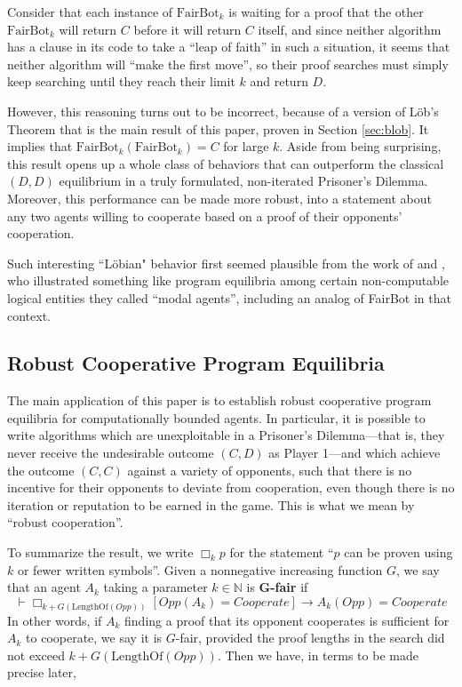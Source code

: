 \documentclass[onecolumn,authordate]{miri-tech-article}
\numberwithin{equation}{section}
\theoremstyle{definition}
\newcommand{\NN}{\mathbb{N}}
\newcommand{\proves}[1]{\underset{#1}{\vdash}}
\newcommand{\bx}[1]{\Box_{#1}}
\renewcommand{\implies}{\rightarrow}
\renewcommand{\-}{^{-1}}
\newcommand{\FB}{\mathrm{FairBot}}
\begin{document}
Consider that each instance of $\FB_k$ is waiting for a proof that the other $\FB_k$ will return $C$ before it will return $C$ itself, and since neither algorithm has a clause in its code to take a ``leap of faith'' in such a situation, it seems that neither algorithm will ``make the first move'', so their proof searches must simply keep searching until they reach their limit $k$ and return $D$.

However, this reasoning turns out to be incorrect, because of a version of L\"{o}b's Theorem that is the main result of this paper, proven in Section \ref{sec:blob}.  It implies that $\FB_k(\FB_k) = C$ for large $k$.  Aside from being surprising, this result opens up a whole class of behaviors that can outperform the classical $(D,D)$ equilibrium in a truly formulated, non-iterated Prisoner's Dilemma.  Moreover, this performance can be made more robust, into a statement about any two agents willing to cooperate based on a proof of their opponents' cooperation.

Such interesting ``L\"{o}bian" behavior first seemed plausible from the work of \citet{Barasz:2014:RobustCooperation} and \citet{LaVictoire:2014:PrisDilemmaLob}, who illustrated something like program equilibria among certain non-computable logical entities they called ``modal agents'', including an analog of FairBot in that context. 

\subsection{Robust Cooperative Program Equilibria}

The main application of this paper is to establish robust cooperative program equilibria for computationally bounded agents.  In particular, it is possible to write algorithms which are unexploitable in a Prisoner's Dilemma---that is, they never receive the undesirable outcome $(C,D)$ as Player 1---and which achieve the outcome $(C,C)$ against a variety of opponents, such that there is no incentive for their opponents to deviate from cooperation, even though there is no iteration or reputation to be earned in the game.  This is what we mean by ``robust cooperation''.

To summarize the result, we write $\bx{k}p$ for the statement ``$p$ can be proven using $k$ or fewer written symbols''.
Given a nonnegative increasing function $G$, we say that an agent $A_k$ taking a parameter $k \in \NN$ is {\bf G-fair} if
$$\proves{} \bx{k+G(\textrm{LengthOf}(Opp))}[Opp(A_k) = Cooperate] \implies A_k(Opp) = Cooperate$$
In other words, if $A_k$ finding a proof that its opponent cooperates is sufficient for $A_k$ to cooperate, we say it is $G$-fair, provided the proof lengths in the search did not exceed $k+G(\textrm{LengthOf}(Opp))$.  Then we have, in terms to be made precise later,
\end{document}
